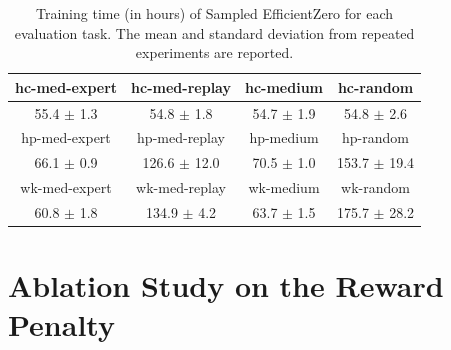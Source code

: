 \begin{table}[htbp]
\centering
\begin{tabular}{c|c|c|c}
\hline
hc-med-expert & hc-med-replay & hc-medium & hc-random \\ 
\hline
55.4 $\pm$ 1.3 & 54.8 $\pm$ 1.8 & 54.7 $\pm$ 1.9 & 54.8 $\pm$ 2.6 \\
\hline
\hline
hp-med-expert & hp-med-replay & hp-medium & hp-random \\
\hline
66.1 $\pm$ 0.9 & 126.6 $\pm$ 12.0 & 70.5 $\pm$ 1.0 & 153.7 $\pm$ 19.4 \\
\hline
\hline
wk-med-expert & wk-med-replay & wk-medium & wk-random \\ 
\hline
60.8 $\pm$ 1.8 & 134.9 $\pm$ 4.2 & 63.7 $\pm$ 1.5 & 175.7 $\pm$ 28.2\\
\hline
\end{tabular}
\caption{Training time (in hours) of Sampled EfficientZero for each evaluation task. The mean and standard deviation from repeated experiments are reported.}
\label{table:5}
\end{table}

\section{Ablation Study on the Reward Penalty} \label{ASRP}

